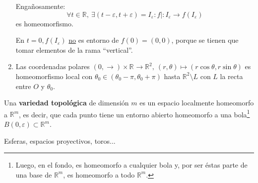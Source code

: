 \begin{ej}[¡Importantes!]
\begin{enumerate}
    Engañosamente: 
    \[
        \forall t \in \mathbb{R},\ \exists \left( t - \varepsilon, t + \varepsilon \right) = I_{\varepsilon}: f| : I_{\varepsilon} \rightarrow f\left( I_{\varepsilon} \right) 
    \]
    es homeomorfismo.

    En $t = 0, f\left( I_{\varepsilon} \right)$ \underline{no} es entorno de $f\left( 0 \right) = \left( 0, 0 \right)$, porque se tienen que tomar elementos de la rama ``vertical''.

    \item Las coordenadas polares $\left( 0, \rightarrow \right) \times \mathbb{R}^{} \rightarrow \mathbb{R}^{2},\ \left( r, \theta \right) \mapsto \left( r\cos \theta, r \sin \theta \right)$ es homeomorfismo local con $\theta_0 \in \left( \theta_0 - \pi, \theta_0 + \pi \right)$ hasta $\mathbb{R}^{2} \setminus L$ con $L$ la recta entre $O$ y $\theta_0$.
\end{enumerate} 
\end{ej}

\begin{defi}
Una \textbf{variedad topológica} de dimensión $m$ es un espacio localmente homeomorfo a $\mathbb{R}^m$, es decir, que cada punto tiene un entorno abierto homeomorfo a una bola\footnote{Luego, en el fondo, es homeomorfo a cualquier bola y, por ser éstas parte de una base de $\mathbb{R}^m$, es homeomorfo a todo $\mathbb{R}^m$.} $B\left( 0, \varepsilon \right) \subset \mathbb{R}^m$.
\end{defi}
\begin{ej}
Esferas, espacios proyectivos, toros...
\end{ej}

